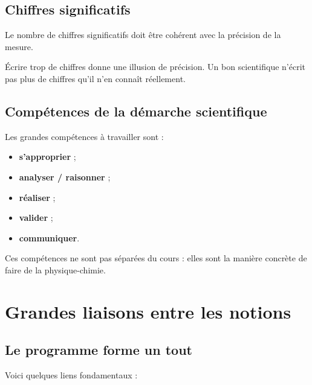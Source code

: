 \documentclass[11pt,a4paper]{article}
\begin{document}
\subsection{Chiffres significatifs}

\begin{definitionbox}
Le nombre de chiffres significatifs doit être cohérent avec la précision de la mesure.
\end{definitionbox}

\begin{sensbox}
Écrire trop de chiffres donne une illusion de précision.  
Un bon scientifique n'écrit pas plus de chiffres qu'il n'en connaît réellement.
\end{sensbox}

\subsection{Compétences de la démarche scientifique}

Les grandes compétences à travailler sont :
\begin{itemize}
    \item \textbf{s'approprier} ;
    \item \textbf{analyser / raisonner} ;
    \item \textbf{réaliser} ;
    \item \textbf{valider} ;
    \item \textbf{communiquer}.
\end{itemize}

\begin{sensbox}
Ces compétences ne sont pas séparées du cours : elles sont la manière concrète de faire de la physique-chimie.
\end{sensbox}

\newpage

\section{Grandes liaisons entre les notions}

\subsection{Le programme forme un tout}

Voici quelques liens fondamentaux :
\end{document}
